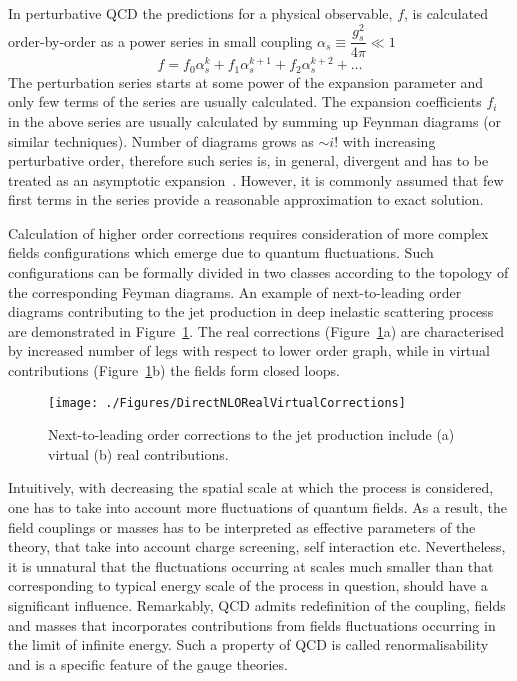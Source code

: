 In perturbative QCD the predictions for a physical observable, $f$, is calculated order-by-order as a power series in small coupling $\alpha_s \equiv \dfrac{g_s^2}{4\pi} \ll 1$
\begin{equation}
   f=f_{0}\alpha^{k}_s + f_{1}\alpha^{k+1}_s + f_{2}\alpha^{k+2}_s + \ldots
	 \label{eq:pertseries}
\end{equation}
The perturbation series starts at some power of the expansion parameter and only few terms of the series are usually calculated. The expansion coefficients $f_i$ in the above series are usually calculated by summing up Feynman diagrams (or similar techniques). Number of diagrams grows as $\sim i!$ with increasing perturbative order, therefore such series is, in general, divergent and has to be treated as an asymptotic expansion~\cite{lipatovQCD}. However, it is commonly assumed that few first terms in the series provide a reasonable approximation to exact solution.

Calculation of higher order corrections requires consideration of more complex fields configurations which emerge due to quantum fluctuations. Such configurations can be formally divided in two classes according to the topology of the corresponding Feyman diagrams. An example of next-to-leading order diagrams contributing to the jet production in deep inelastic scattering process are demonstrated in Figure~\ref{fig:nlojetfeyn}. The real corrections (Figure~\ref{fig:nlojetfeyn}a) are characterised by increased number of legs with respect to lower order graph, while in virtual contributions (Figure~\ref{fig:nlojetfeyn}b) the fields form closed loops.
 
\begin{figure}[h]
 \texttt{[image: ./Figures/DirectNLORealVirtualCorrections]}
\caption{Next-to-leading order corrections to the jet production include (a) virtual (b) real contributions.}
\label{fig:nlojetfeyn}
\end{figure}

Intuitively, with decreasing the spatial scale at which the process is considered, one has to take into account more fluctuations of quantum fields. As a result, the field couplings or masses has to be interpreted as effective parameters of the theory, that take into account charge screening, self interaction etc. Nevertheless, it is unnatural that the fluctuations occurring at scales much smaller than that corresponding to typical energy scale of the process in question, should have a significant influence. Remarkably, QCD admits redefinition of the coupling, fields and masses that incorporates contributions from fields fluctuations occurring in the limit of infinite energy. Such a property of QCD is called renormalisability and is a specific feature of the gauge theories. 

